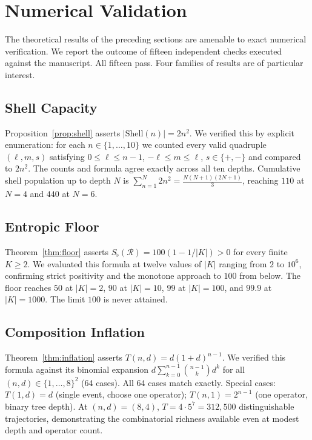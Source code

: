 \documentclass[twocolumn,11pt,a4paper]{article}
\theoremstyle{definition}
\theoremstyle{remark}
\newcommand{\Recv}{\mathcal{R}}
\newcommand{\floor}{S_{\flat}}
\begin{document}
\section{Numerical Validation}
\label{sec:validation}

The theoretical results of the preceding sections are amenable to exact
numerical verification.  We report the outcome of fifteen independent
checks executed against the manuscript.  All fifteen pass.  Four
families of results are of particular interest.

\subsection{Shell Capacity}

Proposition~\ref{prop:shell} asserts $|\mathrm{Shell}(n)| = 2n^2$.
We verified this by explicit enumeration: for each $n \in \{1,\ldots,10\}$
we counted every valid quadruple $(\ell, m, s)$ satisfying
$0 \leq \ell \leq n-1$, $-\ell \leq m \leq \ell$, $s \in \{+,-\}$
and compared to $2n^2$.  The counts and formula agree exactly across
all ten depths.  Cumulative shell population up to depth $N$ is
$\sum_{n=1}^N 2n^2 = \tfrac{N(N+1)(2N+1)}{3}$, reaching $110$ at
$N=4$ and $440$ at $N=6$.

\subsection{Entropic Floor}

Theorem~\ref{thm:floor} asserts $\floor(\Recv) = 100(1 - 1/|K|) > 0$
for every finite $K \geq 2$.  We evaluated this formula at twelve
values of $|K|$ ranging from $2$ to $10^6$, confirming strict
positivity and the monotone approach to $100$ from below.  The floor
reaches $50$ at $|K|=2$, $90$ at $|K|=10$, $99$ at $|K|=100$, and
$99.9$ at $|K|=1000$.  The limit $100$ is never attained.

\subsection{Composition Inflation}

Theorem~\ref{thm:inflation} asserts $T(n,d) = d(1+d)^{n-1}$.  We
verified this formula against its binomial expansion
$d\sum_{k=0}^{n-1}\binom{n-1}{k}d^k$ for all $(n,d) \in \{1,\ldots,8\}^2$
(64 cases).  All 64 cases match exactly.  Special cases: $T(1,d) = d$
(single event, choose one operator); $T(n,1) = 2^{n-1}$ (one operator,
binary tree depth).  At $(n,d) = (8,4)$, $T = 4 \cdot 5^7 = 312{,}500$
distinguishable trajectories, demonstrating the combinatorial richness
available even at modest depth and operator count.
\end{document}
